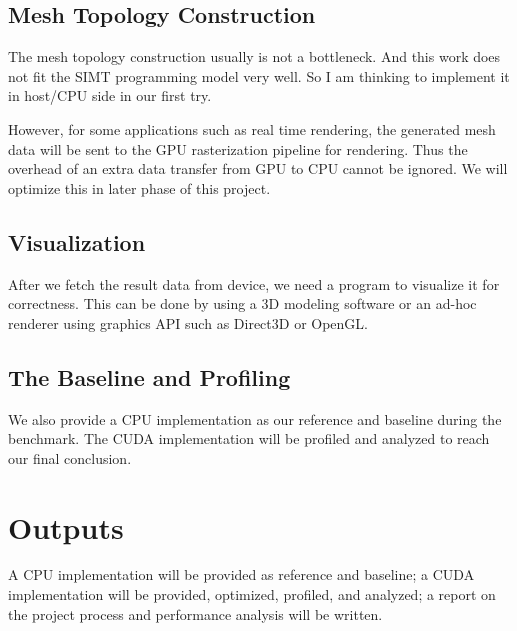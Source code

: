 \documentclass[a4paper,12pt]{article}
\begin{document}
\subsection{Mesh Topology Construction}

The mesh topology construction usually is not a bottleneck.
And this work does not fit the SIMT programming model very well.
So I am thinking to implement it in host/CPU side in our first try.

However, for some applications such as real time rendering,
the generated mesh data will be sent to the GPU rasterization pipeline
for rendering.
Thus the overhead of
an extra data transfer from GPU to CPU
cannot be ignored.
We will optimize this in later phase of this project.

\subsection{Visualization}

After we fetch the result data from device,
we need a program to visualize it for correctness.
This can be done by using a 3D modeling software or an ad-hoc renderer using
graphics API such as Direct3D or OpenGL.

\subsection{The Baseline and Profiling}

We also provide a CPU implementation as our reference and baseline
during the benchmark.
The CUDA implementation will be profiled and analyzed
to reach our final conclusion.

\section{Outputs}

A CPU implementation will be provided as reference and baseline;
a CUDA implementation will be provided, optimized, profiled, and analyzed;
a report on the project process and performance analysis will be written.

\newpage
{}


\end{document}
